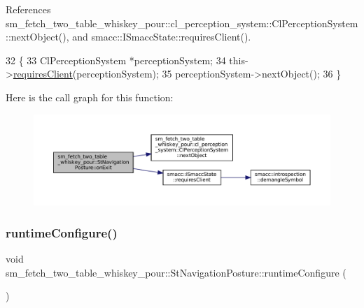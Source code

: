References sm\+\_\+fetch\+\_\+two\+\_\+table\+\_\+whiskey\+\_\+pour\+::cl\+\_\+perception\+\_\+system\+::\+Cl\+Perception\+System\+::next\+Object(), and smacc\+::\+I\+Smacc\+State\+::requires\+Client().


\begin{DoxyCode}
32         \{
33             ClPerceptionSystem *perceptionSystem;
34             this->\hyperlink{classsmacc_1_1ISmaccState_a7f95c9f0a6ea2d6f18d1aec0519de4ac}{requiresClient}(perceptionSystem);
35             perceptionSystem->nextObject();
36         \}
\end{DoxyCode}
Here is the call graph for this function\+:
\nopagebreak
\begin{figure}[H]
\begin{center}
\leavevmode
\includegraphics[width=350pt]{structsm__fetch__two__table__whiskey__pour_1_1StNavigationPosture_a5e0e6613c360a4787eea61e57c9820f9_cgraph}
\end{center}
\end{figure}
\mbox{\label{structsm__fetch__two__table__whiskey__pour_1_1StNavigationPosture_ac9da503168185b9afe89d12235bb8bfb}} 
\subsubsection{\texorpdfstring{runtime\+Configure()}{runtimeConfigure()}}
{\footnotesize\ttfamily void sm\+\_\+fetch\+\_\+two\+\_\+table\+\_\+whiskey\+\_\+pour\+::\+St\+Navigation\+Posture\+::runtime\+Configure (\begin{DoxyParamCaption}{ }\end{DoxyParamCaption})\hspace{0.3cm}{\ttfamily [inline]}}



